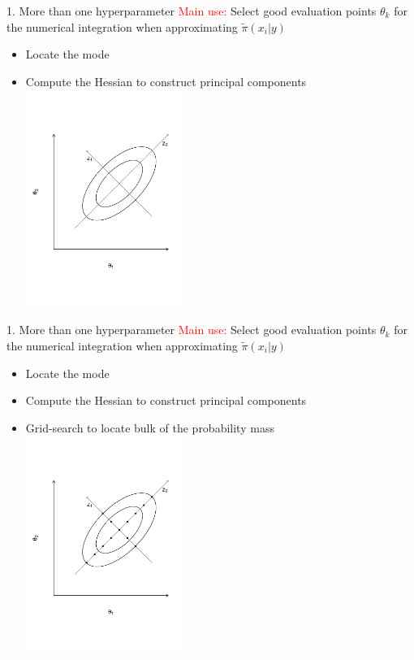 \documentclass[
  ignorenonframetext,
]{beamer}
\providecommand{\tightlist}{%
  \setlength{\itemsep}{0pt}\setlength{\parskip}{0pt}}
\begin{document}
\begin{frame}{1. More than one hyperparameter}
\protect\hypertarget{more-than-one-hyperparameter-1}{}
\textcolor{red}{Main use:} Select good evaluation points \({\theta}_k\)
for the numerical integration when approximating
\(\widetilde{\pi}(x_i|{y})\)

\begin{itemize}
\tightlist
\item
  Locate the mode
\item
  Compute the Hessian to construct principal components
  \includegraphics[width=5cm]{./graphics/ellipse2}
\end{itemize}
\end{frame}

\begin{frame}{1. More than one hyperparameter}
\protect\hypertarget{more-than-one-hyperparameter-2}{}
\textcolor{red}{Main use:} Select good evaluation points \({\theta}_k\)
for the numerical integration when approximating
\(\widetilde{\pi}(x_i|{y})\)

\begin{itemize}
\item
  Locate the mode
\item
  Compute the Hessian to construct principal components
\item
  Grid-search to locate bulk of the probability mass
  \includegraphics[width=5cm]{./graphics/ellipse3}
\end{itemize}
\end{frame}
\end{document}
